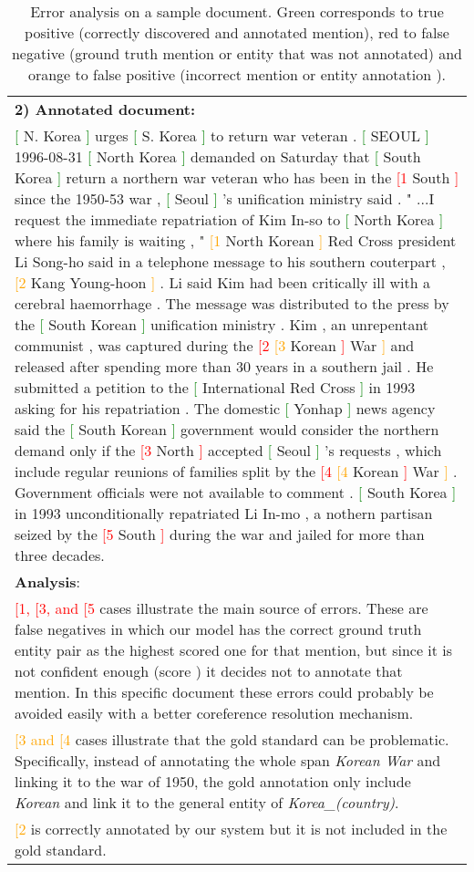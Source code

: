 \documentclass[11pt,a4paper]{article}
\newcommand{\redc}[1] {\textcolor{red}{#1}}
\newcommand{\greenc}[1] {\textcolor{green}{#1}}
\newcommand{\orangec}[1] {\textcolor{orange}{#1}}
\begin{document}
\begin{table*}[!h]
\begin{tabular}{p{15.5cm}}
\hline
\textbf{2) Annotated document:} \\
\greenc{[} N. Korea \greenc{]} urges \greenc{[} S. Korea \greenc{]} to return war veteran . \greenc{[} SEOUL \greenc{]} 1996-08-31 \greenc{[} North Korea \greenc{]} demanded on Saturday that \greenc{[} South Korea \greenc{]} return a northern war veteran who has been in the \redc{[1} South \redc{]} since the 1950-53 war , \greenc{[} Seoul \greenc{]} 's unification ministry said . " ...I request the immediate repatriation of Kim In-so to \greenc{[} North Korea \greenc{]} where his family is waiting , " \orangec{[1} North Korean \orangec{]} Red Cross president Li Song-ho said in a telephone message to his southern couterpart , \orangec{[2} Kang Young-hoon \orangec{]} . Li said Kim had been critically ill with a cerebral haemorrhage . The message was distributed to the press by the \greenc{[} South Korean \greenc{]} unification ministry . Kim , an unrepentant communist , was captured during the \redc{[2} \orangec{[3} Korean \redc{]} War \orangec{]} and released after spending more than 30 years in a southern jail . He submitted a petition to the \greenc{[} International Red Cross \greenc{]} in 1993 asking for his repatriation . The domestic \greenc{[} Yonhap \greenc{]} news agency said the \greenc{[} South Korean \greenc{]} government would consider the northern demand only if the \redc{[3} North \redc{]} accepted \greenc{[} Seoul \greenc{]} 's requests , which include regular reunions of families split by the \redc{[4} \orangec{[4} Korean \redc{]} War \orangec{]} . Government officials were not available to comment . \greenc{[} South Korea \greenc{]} in 1993 unconditionally repatriated Li In-mo , a nothern partisan seized by the \redc{[5} South \redc{]} during the war and jailed for more than three decades.\\
\textbf{Analysis}:\\
\redc{[1, [3, and [5} cases illustrate the main source of errors. These are false negatives in which our model has the correct ground truth entity pair as the highest scored one for that mention, but since it is not confident enough (score ) it decides not to annotate that mention. In this specific document these errors could probably be avoided easily with a better coreference resolution mechanism.\\
\orangec{[3 and [4} cases illustrate that the gold standard can be problematic. Specifically, instead of annotating the whole span \textit{Korean War} and linking it to the war of 1950, the gold annotation only include \textit{Korean} and link it to the general entity of \textit{Korea\_(country)}.\\
\orangec{[2} is correctly annotated by our system but it is not included in the gold standard.\\
\hline

\end{tabular}
\caption{Error analysis on a sample document. Green corresponds to true positive (correctly discovered and annotated mention), red to false negative (ground truth mention or entity that was not annotated) and orange to false positive (incorrect mention or entity annotation ).}
\label{tab:error_analysis}
\end{table*}
\end{document}
